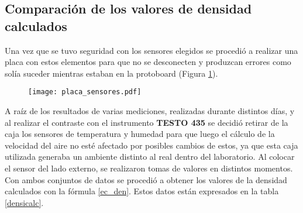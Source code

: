 \subsection{Comparación de los valores de densidad calculados} \label{cap:densidades}

Una vez que se tuvo seguridad con los sensores elegidos se procedió a realizar una placa con estos elementos para que no se desconecten y produzcan errores como solía suceder mientras estaban en la protoboard (Figura \ref{fig:sensoresa}). \\
\begin{figure}[H]
	\centering
	\texttt{[image: placa\_sensores.pdf]}
	\label{fig:sensoresa}
\end{figure}

A raíz de los resultados de varias mediciones, realizadas durante distintos días, y al realizar el contraste con el instrumento \textbf{TESTO 435} se decidió retirar de la caja los sensores de temperatura y humedad para que luego el cálculo de la velocidad del aire no esté afectado por posibles cambios de estos, ya que esta caja utilizada generaba un ambiente distinto al real dentro del laboratorio. Al colocar el sensor del lado externo, se realizaron tomas de valores en distintos momentos. Con ambos conjuntos de datos se procedió a obtener los valores de la densidad calculados con la fórmula \ref{ec_den}. Estos datos están expresados en la tabla \ref{densicalc}. 


